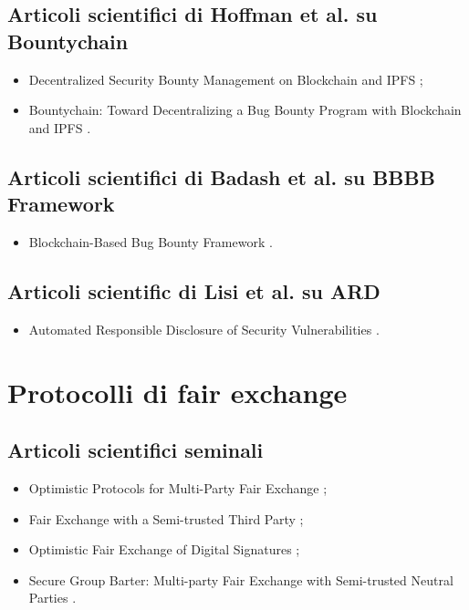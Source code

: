 \subsection*{Articoli scientifici di Hoffman et al. su Bountychain}
\begin{itemize}

\item Decentralized Security Bounty Management on Blockchain and IPFS \cite{hoffman2020bountychain};

\item Bountychain: Toward Decentralizing a Bug Bounty Program with Blockchain and IPFS \cite{hoffman2021bountychain}.

\end{itemize}

\subsection*{Articoli scientifici di Badash et al. su BBBB Framework}
\begin{itemize}

\item Blockchain-Based Bug Bounty Framework \cite{badash2021blockbounty}.

\end{itemize}

\subsection*{Articoli scientific di Lisi et al. su ARD}
\begin{itemize}

\item Automated Responsible Disclosure of Security Vulnerabilities \cite{lisi2022ard}.

\end{itemize}

\section*{Protocolli di fair exchange}

\subsection*{Articoli scientifici seminali}
\begin{itemize}

\item Optimistic Protocols for Multi-Party Fair Exchange \cite{asokan1996fairexchange};

\item Fair Exchange with a Semi-trusted Third Party \cite{franklin1997fairexchange};

\item Optimistic Fair Exchange of Digital Signatures \cite{asokan1998fairexchange};

\item Secure Group Barter: Multi-party Fair Exchange with Semi-trusted Neutral Parties \cite{franklin1998fairexchange}.

\end{itemize}

